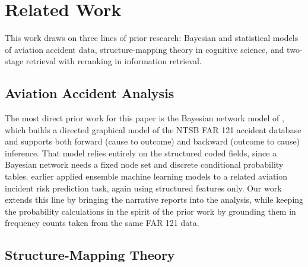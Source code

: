 \documentclass[11pt]{article}
\begin{document}
\section{Related Work}
\label{sec:related}

This work draws on three lines of prior research: Bayesian and statistical models of aviation accident data, structure-mapping theory in cognitive science, and two-stage retrieval with reranking in information retrieval.

\subsection{Aviation Accident Analysis}
\label{sec:related:aviation}

The most direct prior work for this paper is the Bayesian network model of \citet{ZhangMahadevan2021}, which builds a directed graphical model of the NTSB FAR 121 accident database and supports both forward (cause to outcome) and backward (outcome to cause) inference. That model relies entirely on the structured coded fields, since a Bayesian network needs a fixed node set and discrete conditional probability tables. \citet{ZhangMahadevan2019} earlier applied ensemble machine learning models to a related aviation incident risk prediction task, again using structured features only. Our work extends this line by bringing the narrative reports into the analysis, while keeping the probability calculations in the spirit of the prior work by grounding them in frequency counts taken from the same FAR 121 data.

\subsection{Structure-Mapping Theory}
\label{sec:related:sme}
\end{document}
